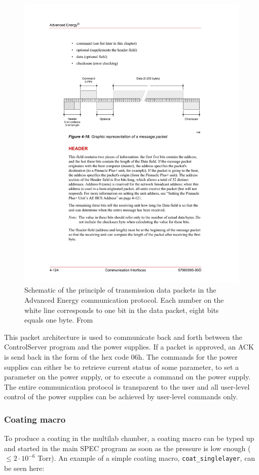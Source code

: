 \begin{figure}[!h]
  \center
  \includegraphics[width=0.9\linewidth]{figures/chamber/ae_packet.pdf}
\caption{\footnotesize Schematic of the principle of transmission data packets in the Advanced Energy communication protocol. Each number on the white line corresponds to one bit in the data packet, eight bits equals one byte. From \cite{Anonymous:zazNQqcS}}\label{fig:ae_packet}
\end{figure}

This packet architecture is used to communicate back and forth between the ControlServer program and the power supplies. If a packet is approved, an ACK is send back in the form of the hex code 06h. The commands for the power supplies can either be to retrieve current status of some parameter, to set a parameter on the power supply, or to execute a command on the power supply. The entire communication protocol is transparent to the user and all user-level control of the power supplies can be achieved by user-level commands only.

\subsubsection{Coating macro}
To produce a coating in the multilab chamber, a coating macro can be typed up and started in the main SPEC program as soon as the pressure is low enough ($\leq2\cdot10^{-6}$ Torr). An example of a simple coating macro, \verb'coat_singlelayer', can be seen here:


